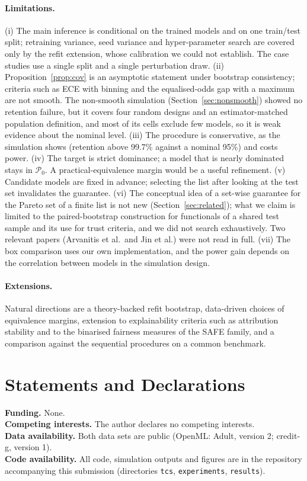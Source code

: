 \documentclass[pdflatex,sn-mathphys-num,iicol]{sn-jnl}
\theoremstyle{thmstyleone}
\theoremstyle{thmstyletwo}
\begin{document}
\paragraph{Limitations.} (i) The main inference is conditional on the trained models and on one train/test split; retraining variance, seed variance and hyper-parameter search \cite{bouthillier2021,damour2022} are covered only by the refit extension, whose calibration we could not establish. The case studies use a single split and a single perturbation draw. (ii) Proposition~\ref{prop:cov} is an asymptotic statement under bootstrap consistency; criteria such as ECE with binning and the equalised-odds gap with a maximum are not smooth. The non-smooth simulation (Section~\ref{sec:nonsmooth}) showed no retention failure, but it covers four random designs and an estimator-matched population definition, and most of its cells exclude few models, so it is weak evidence about the nominal level. (iii) The procedure is conservative, as the simulation shows (retention above 99.7\% against a nominal 95\%) and costs power. (iv) The target is strict dominance; a model that is nearly dominated stays in $\mathcal{P}_0$. A practical-equivalence margin would be a useful refinement. (v) Candidate models are fixed in advance; selecting the list after looking at the test set invalidates the guarantee. (vi) The conceptual idea of a set-wise guarantee for the Pareto set of a finite list is not new (Section~\ref{sec:related}); what we claim is limited to the paired-bootstrap construction for functionals of a shared test sample and its use for trust criteria, and we did not search exhaustively. Two relevant papers (Arvanitis et al.\ and Jin et al.) were not read in full. (vii) The box comparison uses our own implementation, and the power gain depends on the correlation between models in the simulation design.

\paragraph{Extensions.} Natural directions are a theory-backed refit bootstrap, data-driven choices of equivalence margins, extension to explainability criteria such as attribution stability and to the binarised fairness measures of the SAFE family, and a comparison against the sequential procedures on a common benchmark.

\section*{Statements and Declarations}
\noindent\textbf{Funding.} None.\\
\textbf{Competing interests.} The author declares no competing interests.\\
\textbf{Data availability.} Both data sets are public (OpenML: Adult, version 2; credit-g, version 1).\\
\textbf{Code availability.} All code, simulation outputs and figures are in the repository accompanying this submission (directories \texttt{tcs}, \texttt{experiments}, \texttt{results}).
\end{document}
